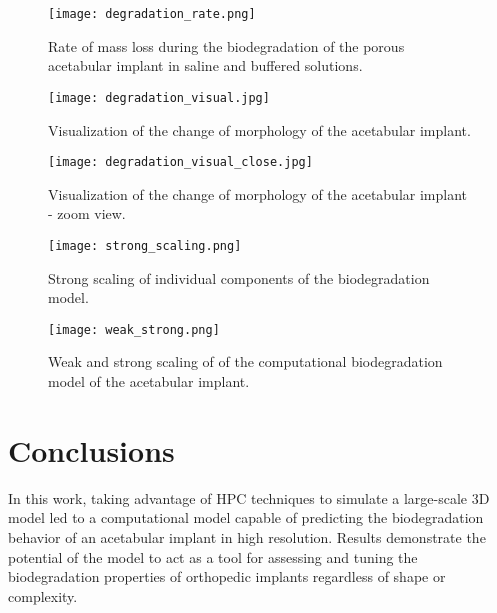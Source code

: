 \begin{figure}[h]
\centering
\medskip
\texttt{[image: degradation\_rate.png]}
\caption[Biodegradation rate for the acetabular implant]{Rate of mass loss during the biodegradation of the porous acetabular implant in saline and buffered solutions.} \label{fig:cup_degradation_rate}
\end{figure}

\begin{figure}[h]
\centering
\medskip
\texttt{[image: degradation\_visual.jpg]}
\caption[Visualization of the change of morphology of the acetabular implant]{Visualization of the change of morphology of the acetabular implant.} \label{fig:cup_degradation_visual}
\end{figure}

\begin{figure}[h]
\centering
\medskip
\texttt{[image: degradation\_visual\_close.jpg]}
\caption[Visualization of the change of morphology of the acetabular implant]{Visualization of the change of morphology of the acetabular implant - zoom view.} \label{fig:cup_degradation_visual_close}
\end{figure}

\begin{figure}[h]
\centering
\medskip
\texttt{[image: strong\_scaling.png]}
\caption[Strong scaling of individual components of the biodegradation model]{Strong scaling of individual components of the biodegradation model.} \label{fig:cup_strong_scaling}
\end{figure}


\begin{figure}[h]
\centering
\medskip
\texttt{[image: weak\_strong.png]}
\caption[Weak and strong scaling of of the acetabular implant model]{Weak and strong scaling of of the computational biodegradation model of the acetabular implant.} \label{fig:cup_weak_strong}
\end{figure}

\section{Conclusions}

In this work, taking advantage of HPC techniques to simulate a large-scale 3D model led to a computational model capable of predicting the biodegradation behavior of an acetabular implant in high resolution. Results demonstrate the potential of the model to act as a tool for assessing and tuning the biodegradation properties of orthopedic  implants regardless of shape or complexity.

